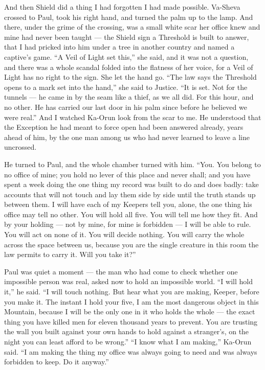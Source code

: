And then Shield did a thing I had forgotten I had made possible. Va-Sheva crossed to Paul, took his right hand, and turned the palm up to the lamp. And there, under the grime of the crossing, was a small white scar her office knew and mine had never been taught --- the Shield sign a Threshold is built to answer, that I had pricked into him under a tree in another country and named a captive's game. ``A Veil of Light set this,'' she said, and it was not a question, and there was a whole scandal folded into the flatness of her voice, for a Veil of Light has no right to the sign. She let the hand go. ``The law says the Threshold opens to a mark set into the hand,'' she said to Justice. ``It is set. Not for the tunnels --- he came in by the seam like a thief, as we all did. For this hour, and no other. He has carried our last door in his palm since before he believed we were real.'' And I watched Ka-Orun look from the scar to me. He understood that the Exception he had meant to force open had been answered already, years ahead of him, by the one man among us who had never learned to leave a line uncrossed.\par

He turned to Paul, and the whole chamber turned with him. ``You. You belong to no office of mine; you hold no lever of this place and never shall; and you have spent a week doing the one thing my record was built to do and does badly: take accounts that will not touch and lay them side by side until the truth stands up between them. I will have each of my Keepers tell you, alone, the one thing his office may tell no other. You will hold all five. You will tell me how they fit. And by your holding --- not by mine, for mine is forbidden --- I will be able to rule. You will act on none of it. You will decide nothing. You will carry the whole across the space between us, because you are the single creature in this room the law permits to carry it. Will you take it?''\par

Paul was quiet a moment --- the man who had come to check whether one impossible person was real, asked now to hold an impossible world. ``I will hold it,'' he said. ``I will touch nothing. But hear what you are making, Keeper, before you make it. The instant I hold your five, I am the most dangerous object in this Mountain, because I will be the only one in it who holds the whole --- the exact thing you have killed men for eleven thousand years to prevent. You are trusting the wall you built against your own hands to hold against a stranger's, on the night you can least afford to be wrong.'' ``I know what I am making,'' Ka-Orun said. ``I am making the thing my office was always going to need and was always forbidden to keep. Do it anyway.''\par

